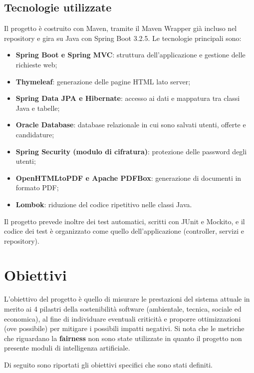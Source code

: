 \documentclass[12pt,a4paper]{article}
\begin{document}
    \subsection{Tecnologie utilizzate}
    Il progetto è costruito con Maven, tramite il Maven Wrapper già incluso nel
    repository e gira su Java con Spring Boot 3.2.5. Le tecnologie principali
    sono:
    \begin{itemize}
        \item \textbf{Spring Boot e Spring MVC}: struttura dell'applicazione e
        gestione delle richieste web;
        \item \textbf{Thymeleaf}: generazione delle pagine HTML lato server;
        \item \textbf{Spring Data JPA e Hibernate}: accesso ai dati e
        mappatura tra classi Java e tabelle;
        \item \textbf{Oracle Database}: database relazionale in cui sono salvati
        utenti, offerte e candidature;
        \item \textbf{Spring Security (modulo di cifratura)}: protezione delle
        password degli utenti;
        \item \textbf{OpenHTMLtoPDF e Apache PDFBox}: generazione di documenti
        in formato PDF;
        \item \textbf{Lombok}: riduzione del codice ripetitivo nelle classi Java.
    \end{itemize}

    Il progetto prevede inoltre dei test automatici, scritti con JUnit e
    Mockito, e il codice dei test è organizzato come quello dell'applicazione
    (controller, servizi e repository).

    \section{Obiettivi}
    L'obiettivo del progetto è quello di misurare le prestazioni del sistema attuale
    in merito ai 4 pilastri della sostenibilità software (ambientale, tecnica, sociale ed economica), al fine
    di individuare eventuali criticità e proporre ottimizzazioni (ove possibile) per mitigare i possibili
    impatti negativi.
    Si nota che le metriche che riguardano la \textbf{fairness} non sono state utilizzate in quanto il progetto non presente
    moduli di intelligenza artificiale.

    Di seguito sono riportati gli obiettivi specifici che sono stati definiti.
\end{document}
